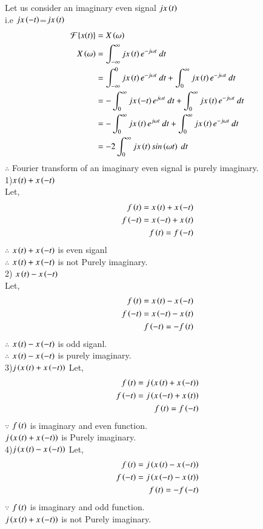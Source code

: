 \documentclass[journal,12pt,twocolumn]{IEEEtran}
\theoremstyle{remark}
\begin{document}
Let us consider an imaginary even signal $jx\left(t\right)$\\
i.e $jx\left(-t\right)$=$jx\left(t\right)$
\begin{align}
\mathcal{F}\{x(t)\} &= X\brak{\omega}\\
X\brak{\omega}&=\int_{-\infty}^{\infty} jx\brak{t} e^{-j \omega t} \ dt\\
&=\int_{-\infty}^{0} jx\brak{t} e^{-j \omega t} \ dt+\int_{0}^{\infty} jx\brak{t} e^{-j \omega t} \ dt\\
&=-\int_{0}^{\infty} jx\brak{-t} e^{j \omega t} \ dt+\int_{0}^{\infty} jx\brak{t} e^{-j \omega t} \ dt\\
&=-\int_{0}^{\infty} jx\brak{t} e^{j \omega t} \ dt+\int_{0}^{\infty} jx\brak{t} e^{-j \omega t} \ dt\\
&=-2\int_{0}^{\infty} j x\brak{t} sin\brak{\omega t}  \ dt\\
\end{align}
$\therefore$ Fourier transform of an imaginary even signal is purely imaginary.\\
1)$x\left(t\right) + x\left(-t\right)$\\
Let,
\begin{align}
  f\left(t\right)= x\left(t\right) + x\left(-t\right)\\
  f\left(-t\right)=x\left(-t\right) + x\left(t\right)\\
  f\left(t\right)=f\left(-t\right)
\end{align}
$\therefore$ $x\left(t\right) + x\left(-t\right)$ is even siganl\\
$\therefore$ $x\left(t\right) + x\left(-t\right)$ is not Purely imaginary.\\
2) $x\left(t\right) - x\left(-t\right)$\\
Let,
\begin{align}
  f\left(t\right)= x\left(t\right) - x\left(-t\right)\\
  f\left(-t\right)=x\left(-t\right) - x\left(t\right)\\
  f\left(-t\right)=-f\left(t\right)
\end{align}
$\therefore$ $x\left(t\right) - x\left(-t\right)$ is odd siganl.\\
$\therefore$ $x\left(t\right) - x\left(-t\right)$ is purely imaginary.\\
3)$j\left(x\left(t\right) + x\left(-t\right)\right)$
Let,
\begin{align}
  f\left(t\right)=j\left(x\left(t\right) + x\left(-t\right)\right)\\
  f\left(-t\right)=j\left(x\left(-t\right) + x\left(t\right)\right)\\
  f\left(t\right)=f\left(-t\right)
\end{align}
$\because$ $f\left(t\right)$ is imaginary and even function.\\
$j\left(x\left(t\right) + x\left(-t\right)\right)$ is Purely imaginary.\\
4)$j\left(x\left(t\right) - x\left(-t\right)\right)$
Let,
\begin{align}
   f\left(t\right)=j\left(x\left(t\right) - x\left(-t\right)\right)\\
  f\left(-t\right)=j\left(x\left(-t\right) - x\left(t\right)\right)\\
  f\left(t\right)=-f\left(-t\right)
\end{align}
$\because$ $f\left(t\right)$ is imaginary and odd function.\\
$j\left(x\left(t\right) + x\left(-t\right)\right)$ is not Purely imaginary.\\
\end{document}
